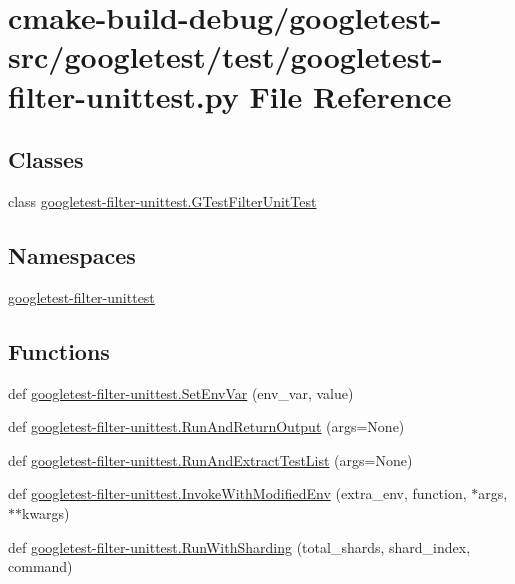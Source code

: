 \hypertarget{googletest-filter-unittest_8py}{}\section{cmake-\/build-\/debug/googletest-\/src/googletest/test/googletest-\/filter-\/unittest.py File Reference}
\label{googletest-filter-unittest_8py}
\subsection*{Classes}
\begin{DoxyCompactItemize}
\item 
class \mbox{\hyperlink{classgoogletest-filter-unittest_1_1GTestFilterUnitTest}{googletest-\/filter-\/unittest.\+G\+Test\+Filter\+Unit\+Test}}
\end{DoxyCompactItemize}
\subsection*{Namespaces}
\begin{DoxyCompactItemize}
\item 
 \mbox{\hyperlink{namespacegoogletest-filter-unittest}{googletest-\/filter-\/unittest}}
\end{DoxyCompactItemize}
\subsection*{Functions}
\begin{DoxyCompactItemize}
\item 
def \mbox{\hyperlink{namespacegoogletest-filter-unittest_a829bf5a2df452c96f0ad7a1f0d47401e}{googletest-\/filter-\/unittest.\+Set\+Env\+Var}} (env\+\_\+var, value)
\item 
def \mbox{\hyperlink{namespacegoogletest-filter-unittest_a24bae2131f3ea9a470f76a090f704d23}{googletest-\/filter-\/unittest.\+Run\+And\+Return\+Output}} (args=None)
\item 
def \mbox{\hyperlink{namespacegoogletest-filter-unittest_a400558042f3187a396a3dfe020423dfb}{googletest-\/filter-\/unittest.\+Run\+And\+Extract\+Test\+List}} (args=None)
\item 
def \mbox{\hyperlink{namespacegoogletest-filter-unittest_aaad57c395db92d5b0cdd94a3af2359bf}{googletest-\/filter-\/unittest.\+Invoke\+With\+Modified\+Env}} (extra\+\_\+env, function, $\ast$args, $\ast$$\ast$kwargs)
\item 
def \mbox{\hyperlink{namespacegoogletest-filter-unittest_a838960aa0f3d4cce4b0f76169929b94e}{googletest-\/filter-\/unittest.\+Run\+With\+Sharding}} (total\+\_\+shards, shard\+\_\+index, command)
\end{DoxyCompactItemize}
